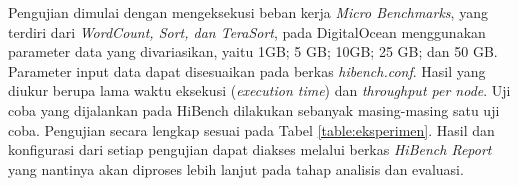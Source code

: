 Pengujian dimulai dengan mengeksekusi beban kerja \textit{Micro Benchmarks}, yang terdiri dari \textit{WordCount, Sort, dan TeraSort}, pada DigitalOcean menggunakan parameter data yang divariasikan, yaitu {1GB; 5 GB; 10GB; 25 GB; dan 50 GB}. Parameter input data dapat disesuaikan pada berkas \textit{hibench.conf}. Hasil yang diukur berupa lama waktu eksekusi (\textit{execution time}) dan \textit{throughput per node}. Uji coba yang dijalankan pada HiBench dilakukan sebanyak masing-masing satu uji coba. Pengujian secara lengkap sesuai pada Tabel \ref{table:eksperimen}. Hasil dan konfigurasi dari setiap pengujian dapat diakses melalui berkas \textit{HiBench Report} yang nantinya akan diproses lebih lanjut pada tahap analisis dan evaluasi.

\begin{table}[h!]
\caption{Eksperimen yang Akan diuji Coba}
\label{table:eksperimen}
\end{table}


